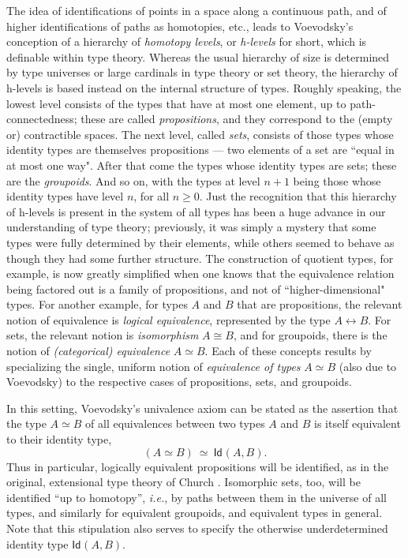 \documentclass[11pt]{article}
\newcommand{\Id}{\mathsf{Id}}
\newcommand{\id}[1]{\Id_{#1}}
\theoremstyle{remark}
\theoremstyle{definition}
\begin{document}
The idea of identifications of points in a space along a continuous path, and of higher identifications of paths as homotopies, etc., leads to Voevodsky's conception of a hierarchy of \emph{homotopy levels}, or
\emph{h-levels} for short, which is definable within type theory.  Whereas the usual hierarchy of size is determined by type
universes or large cardinals in type theory or set theory, the hierarchy of h-levels is based instead on the internal
structure of types.  Roughly speaking, the lowest level consists of the types that have at most one element, up to
path-connectedness; these are called \emph{propositions}, and they correspond to the (empty or) contractible spaces.
The next level, called \emph{sets}, consists of those types whose identity types are themselves propositions --- two
elements of a set are ``equal in at most one way".  After that come the types whose
identity types are sets; these are the \emph{groupoids}.  And so on, with the types at level $n+1$ being those whose identity types have 
level $n$, for all $n\geq 0$.  Just the recognition that this hierarchy of h-levels is present in the system of all types
has been a huge advance in our understanding of type theory; previously, it was simply a mystery that some types were
fully determined by their elements, while others seemed to behave as though they had some further structure.  The
construction of quotient types, for example, is now greatly simplified when one knows that the equivalence relation
being factored out is a family of propositions, and not of ``higher-dimensional" types.  For another example, for types
$A$ and $B$ that are propositions, the relevant notion of equivalence is \emph{logical equivalence}, represented by the
type $A\leftrightarrow B$.  For sets, the relevant notion is \emph{isomorphism} $A\cong B$, and for groupoids, there is
the notion of \emph{(categorical) equivalence} $A\simeq B$.  Each of these concepts results by specializing the single,
uniform notion of \emph{equivalence of types} $A\simeq B$ (also due to Voevodsky) to the respective cases of
propositions, sets, and groupoids.

In this setting, Voevodsky's univalence axiom can be stated as the assertion that the type $A\simeq B$ of all
equivalences between two types $A$ and $B$ is itself equivalent to their identity type,
\[\tag{UA}
(A\simeq B)\ \simeq\  \id{}(A,B).
\]
Thus in particular, logically equivalent propositions will be identified, as in the original, extensional type theory of
Church \cite{Church}.  Isomorphic sets, too, will be identified ``up to homotopy'', \textit{i.e.}, by paths between them
in the universe of all types, and similarly for equivalent groupoids, and equivalent types in general.  Note that this
stipulation also serves to specify the otherwise underdetermined identity type $ \id{}(A,B)$.
\end{document}
